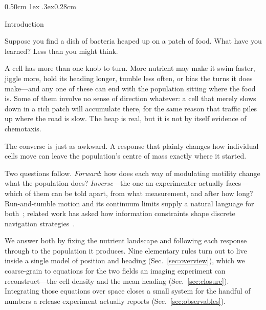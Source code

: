 \documentclass[
  reprint,
  superscriptaddress,
  amsmath,
  amssymb,
  aps,
  pre,
  nofootinbib,
  floatfix
]{revtex4-2}
\makeatletter
\def\section{\@startsection{section}{1}{\z@}%
  {0.50cm \@plus1ex \@minus.3ex}{0.28cm}%
  {\normalfont\small\bfseries\raggedright}}%
\makeatother
\begin{document}
\section{Introduction}
\label{sec:introduction}

Suppose you find a dish of bacteria heaped up on a patch of food.  What have
you learned?  Less than you might think.

A cell has more than one knob to turn.  More nutrient may make it swim faster,
jiggle more, hold its heading longer, tumble less often, or bias the turns it
does make---and any one of these can end with the population sitting where the
food is.  Some of them involve no sense of direction whatever: a cell that
merely slows down in a rich patch will accumulate there, for the same reason
that traffic piles up where the road is slow.  The heap is real, but it is not
by itself evidence of chemotaxis.

The converse is just as awkward.  A response that plainly changes how
individual cells move can leave the population's centre of mass exactly where
it started.

Two questions follow.  \emph{Forward}: how does each way of modulating
motility change what the population does?  \emph{Inverse}---the one an
experimenter actually faces---which of them can be told apart, from what
measurement, and after how long?  Run-and-tumble motion and its continuum
limits supply a natural language for
both~\cite{berg1972,schnitzer1993,tailleur2008}; related work has asked how
information constraints shape discrete navigation
strategies~\cite{betancourt2026}.

We answer both by fixing the nutrient landscape and following each response
through to the population it produces.  Nine elementary rules turn out to live
inside a single model of position and heading (Sec.~\ref{sec:overview}),
which we coarse-grain to equations for the two
fields an imaging experiment can reconstruct---the cell density and the mean
heading (Sec.~\ref{sec:closure}).  Integrating those equations over space
closes a small system for the handful of numbers a release experiment actually
reports (Sec.~\ref{sec:observables}).
\end{document}
